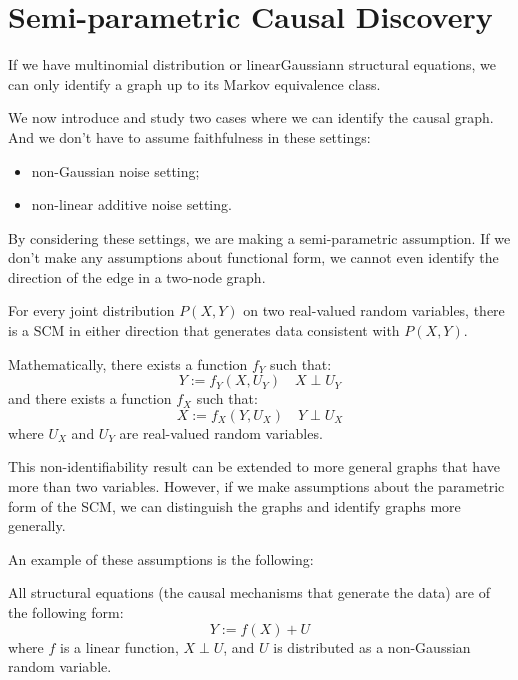 \section{Semi-parametric Causal Discovery}
\begin{definition}
    If we have multinomial distribution or linearGaussiann structural equations,
    we can only identify a graph up to its Markov equivalence class.
\end{definition}

We now introduce and study two cases where we can identify the causal graph. And
we don't have to assume faithfulness in these settings:
\begin{itemize}
    \item non-Gaussian noise setting;
    \item non-linear additive noise setting.
\end{itemize}
By considering these settings, we are making a semi-parametric assumption. If we
don't make any assumptions about functional form, we cannot even identify the
direction of the edge in a two-node graph.
\begin{definition}
    For every joint distribution $P(X, Y)$ on two real-valued random variables,
    there is a SCM in either direction that generates data consistent with $P(X, Y)$.

    Mathematically, there exists a function $f_Y$ such that:
    \begin{equation*}
        Y := f_Y(X, U_Y) \quad X \perp U_Y
    \end{equation*}
    and there exists a function $f_X$ such that:
    \begin{equation*}
        X := f_X(Y, U_X) \quad Y \perp U_X
    \end{equation*}
    where $U_X$ and $U_Y$ are real-valued random variables.
\end{definition}
This non-identifiability result can be extended to more general graphs that have
more than two variables. However, if we make assumptions about the parametric form
of the SCM, we can distinguish the graphs and identify graphs more generally.

An example of these assumptions is the following:
\begin{definition}
    All structural equations (the causal mechanisms that generate the data) are
    of the following form:
    \begin{equation}
        Y := f(X) + U
    \end{equation}
    where $f$ is a linear function, $X \perp U$, and $U$ is distributed as a non-Gaussian
    random variable.
\end{definition}

